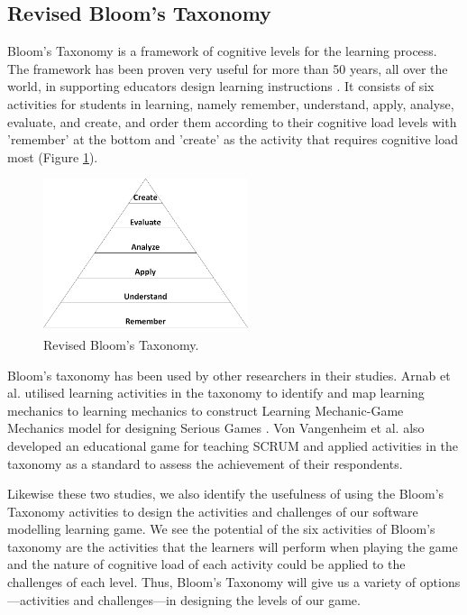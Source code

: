 \documentclass[12pt, a4paper]{report}
\begin{document}
\subsection{Revised Bloom's Taxonomy}
Bloom's Taxonomy \cite{krathwohl2002revision} is a framework of cognitive levels for the learning process. The framework has been proven very useful for more than 50 years, all over the world, in supporting educators design learning instructions \cite{munzenmaier2013bloom}. It consists of six activities for students in learning, namely remember, understand, apply, analyse, evaluate, and create, and order them according to their cognitive load levels with 'remember' at the bottom and 'create' as the activity that requires cognitive load most (Figure \ref{bloom}). 

\begin{figure}[ht]
\centering
\includegraphics[width=6cm]{bloom}
\caption{Revised Bloom's Taxonomy\cite{krathwohl2002revision}.}
\label{bloom}
\end{figure}

Bloom's taxonomy has been used by other researchers in their studies. Arnab et al. utilised learning activities in the taxonomy to identify and map learning mechanics to learning mechanics to construct Learning Mechanic-Game Mechanics model for designing Serious Games \cite{arnab2015mapping}. Von Vangenheim et al. \cite{von2013scrumia} also developed an educational game for teaching SCRUM and applied activities in the taxonomy as a standard to assess the achievement of their respondents. 

Likewise these two studies, we also identify the usefulness of using the Bloom's Taxonomy activities to design the activities and challenges of our software modelling learning game. We see the potential of the six activities of Bloom's taxonomy are the activities that the learners will perform when playing the game and the nature of cognitive load of each activity could be applied to the challenges of each level. Thus, Bloom's Taxonomy will give us a variety of options---activities and challenges---in designing the levels of our game.
\end{document}
